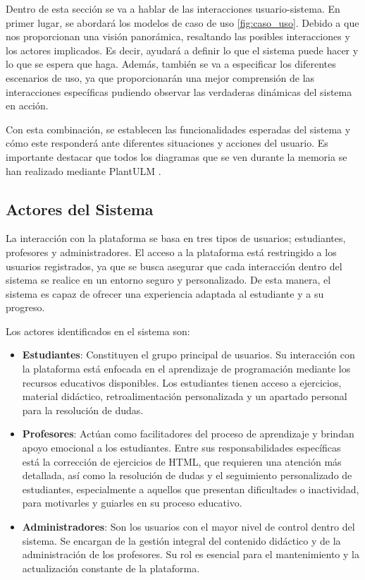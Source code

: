 Dentro de esta sección se va a hablar de las interacciones usuario-sistema. En primer lugar, se abordará los modelos de caso de uso \ref{fig:caso_uso}. Debido a que nos proporcionan una visión panorámica, resaltando las posibles interacciones y los actores implicados. Es decir, ayudará a definir lo que el sistema puede hacer y lo que se espera que haga. Además, también se va a especificar los diferentes escenarios de uso, ya que proporcionarán una mejor comprensión de las interacciones específicas pudiendo observar las verdaderas dinámicas del sistema en acción.

Con esta combinación, se establecen las funcionalidades esperadas del sistema y cómo este responderá ante diferentes situaciones y acciones del usuario. Es importante destacar que todos los diagramas que se ven durante la memoria se han realizado mediante PlantULM \cite{planttext}. 

\subsection{Actores del Sistema}

La interacción con la plataforma se basa en tres tipos de usuarios; estudiantes, profesores y administradores. El acceso a la plataforma está restringido a los usuarios registrados, ya que se busca asegurar que cada interacción dentro del sistema se realice en un entorno seguro y personalizado. De esta manera, el sistema es capaz de ofrecer una experiencia adaptada al estudiante y a su progreso.

Los actores identificados en el sistema son:

\begin{itemize}
    \item \textbf{Estudiantes}: Constituyen el grupo principal de usuarios. Su interacción con la plataforma está enfocada en el aprendizaje de programación mediante los recursos educativos disponibles. Los estudiantes tienen acceso a ejercicios, material didáctico, retroalimentación personalizada y un apartado personal para la resolución de dudas.
    \item \textbf{Profesores}: Actúan como facilitadores del proceso de aprendizaje y brindan apoyo emocional a los estudiantes. Entre sus responsabilidades específicas está la corrección de ejercicios de HTML, que requieren una atención más detallada, así como la resolución de dudas y el seguimiento personalizado de estudiantes, especialmente a aquellos que presentan dificultades o inactividad, para motivarles y guiarles en su proceso educativo.
    \item \textbf{Administradores}: Son los usuarios con el mayor nivel de control dentro del sistema. Se encargan de la gestión integral del contenido didáctico y de la administración de los profesores. Su rol es esencial para el mantenimiento y la actualización constante de la plataforma.
\end{itemize}



